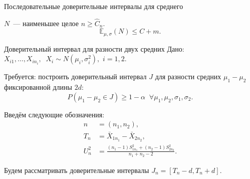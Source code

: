 \documentclass[9pt,pdf,utf8,hyperref={unicode},aspectratio=169]{beamer}
\renewcommand{\leq}{\leqslant}
\renewcommand{\geq}{\geqslant}
\begin{document}
\begin{frame}{Последовательные доверительные интервалы для среднего}
{    \bigskip
    
    $N$~--- наименьшее целое $n\geq \hat{C}_n$.
    $$\mathbb{E}_{\mu,\sigma}\left(N\right) \leq C+m.$$
    }
    
\end{frame}

\begin{frame}{Доверительный интервал для разности двух средних}
    Дано: $X_{i1},\dots,X_{in_i}, \;\; X_i \sim N\left(\mu_i, \sigma_i^2\right),$ \; $i=1,2.$ 
    
    \bigskip
    
    Требуется: построить доверительный интервал $J$ для разности средних $\mu_1-\mu_2$ фиксированной длины $2d$:
     $$P\left(\mu_1-\mu_2\in J\right)\geq 1-\alpha \;\; \forall \mu_1,\mu_2, \sigma_1,\sigma_2.$$
     
     \bigskip
     
     Введём следующие обозначения:
     \begin{align*}
     n     &= \left(n_1,n_2\right), \\
     T_n   &= \bar{X}_{1n_1} -  \bar{X}_{2n_2}, \\
     U_n^2 &= \frac{\left(n_1-1\right)S_{1n_1}^2 + \left(n_2-1\right)S_{2n_2}^2}{n_1+n_2-2}.
     \end{align*}
     
     \bigskip
     
     Будем рассматривать доверительные интервалы $J_n = \left[T_n-d, T_n+d\right]$.
\end{frame}
\end{document}
